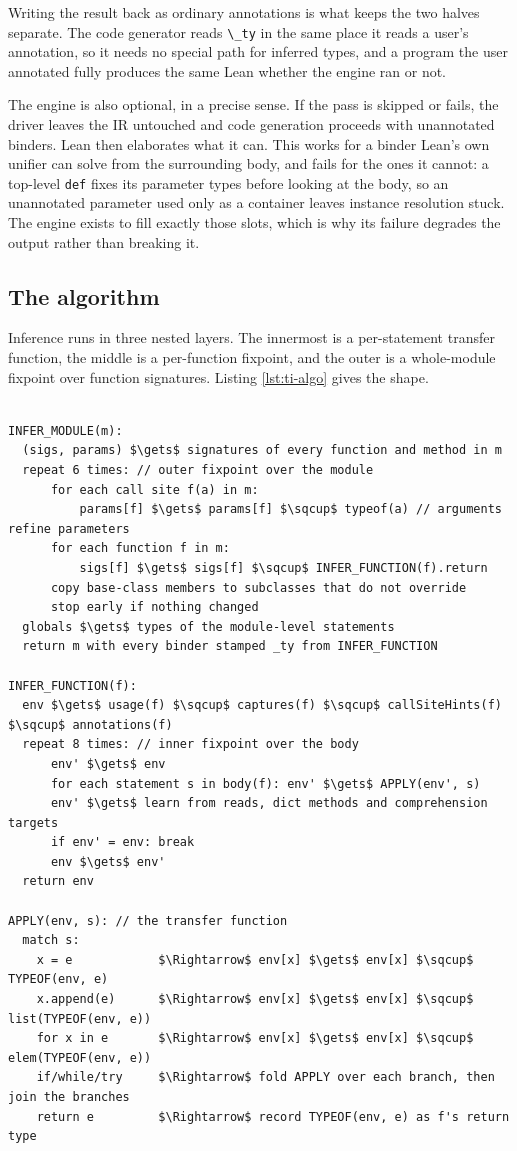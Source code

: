 \documentclass{article}
\newcommand{\code}{\lstinline}
\begin{document}
Writing the result back as ordinary annotations is what keeps the two halves separate. The code generator reads \code{\_ty} in the same place it reads a user's annotation, so it needs no special path for inferred types, and a program the user annotated fully produces the same Lean whether the engine ran or not.

The engine is also optional, in a precise sense. If the pass is skipped or fails, the driver leaves the IR untouched and code generation proceeds with unannotated binders. Lean then elaborates what it can. This works for a binder Lean's own unifier can solve from the surrounding body, and fails for the ones it cannot: a top-level \code{def} fixes its parameter types before looking at the body, so an unannotated parameter used only as a container leaves instance resolution stuck. The engine exists to fill exactly those slots, which is why its failure degrades the output rather than breaking it.

\subsection{The algorithm}\label{app:ti-algo}

Inference runs in three nested layers. The innermost is a per-statement transfer function, the middle is a per-function fixpoint, and the outer is a whole-module fixpoint over function signatures. Listing \ref{lst:ti-algo} gives the shape.

\begin{lstlisting}[style=pseudo,caption={The inference pipeline. $\sqcup$ is the lattice join.},label={lst:ti-algo}]

INFER_MODULE(m):
  (sigs, params) $\gets$ signatures of every function and method in m
  repeat 6 times: // outer fixpoint over the module
      for each call site f(a) in m:
          params[f] $\gets$ params[f] $\sqcup$ typeof(a) // arguments refine parameters
      for each function f in m:
          sigs[f] $\gets$ sigs[f] $\sqcup$ INFER_FUNCTION(f).return
      copy base-class members to subclasses that do not override
      stop early if nothing changed
  globals $\gets$ types of the module-level statements
  return m with every binder stamped _ty from INFER_FUNCTION

INFER_FUNCTION(f):
  env $\gets$ usage(f) $\sqcup$ captures(f) $\sqcup$ callSiteHints(f) $\sqcup$ annotations(f)
  repeat 8 times: // inner fixpoint over the body
      env' $\gets$ env
      for each statement s in body(f): env' $\gets$ APPLY(env', s)
      env' $\gets$ learn from reads, dict methods and comprehension targets
      if env' = env: break
      env $\gets$ env'
  return env

APPLY(env, s): // the transfer function
  match s:
    x = e            $\Rightarrow$ env[x] $\gets$ env[x] $\sqcup$ TYPEOF(env, e)
    x.append(e)      $\Rightarrow$ env[x] $\gets$ env[x] $\sqcup$ list(TYPEOF(env, e))
    for x in e       $\Rightarrow$ env[x] $\gets$ env[x] $\sqcup$ elem(TYPEOF(env, e))
    if/while/try     $\Rightarrow$ fold APPLY over each branch, then join the branches
    return e         $\Rightarrow$ record TYPEOF(env, e) as f's return type
\end{lstlisting}
\end{document}
